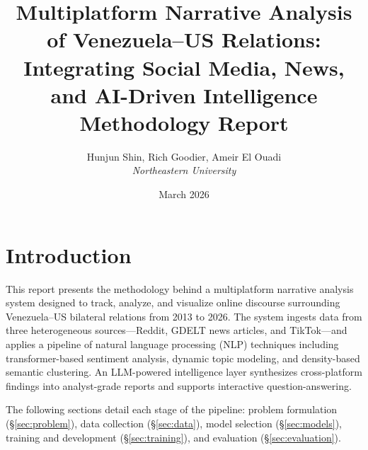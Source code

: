 \documentclass[12pt, a4paper]{article}
\title{
  \textbf{Multiplatform Narrative Analysis of Venezuela--US Relations:}\\[6pt]
  \Large Integrating Social Media, News, and AI-Driven Intelligence\\[12pt]
  \large Methodology Report
}
\author{
  Hunjun Shin, Rich Goodier, Ameir El Ouadi\\
  \textit{Northeastern University}
}
\date{March 2026}
\begin{document}
\maketitle

\section{Introduction}

This report presents the methodology behind a multiplatform narrative analysis system designed to track, analyze, and visualize online discourse surrounding Venezuela--US bilateral relations from 2013 to 2026. The system ingests data from three heterogeneous sources---Reddit, GDELT news articles, and TikTok---and applies a pipeline of natural language processing (NLP) techniques including transformer-based sentiment analysis, dynamic topic modeling, and density-based semantic clustering. An LLM-powered intelligence layer synthesizes cross-platform findings into analyst-grade reports and supports interactive question-answering.

The following sections detail each stage of the pipeline: problem formulation (\S\ref{sec:problem}), data collection (\S\ref{sec:data}), model selection (\S\ref{sec:models}), training and development (\S\ref{sec:training}), and evaluation (\S\ref{sec:evaluation}).
\end{document}
